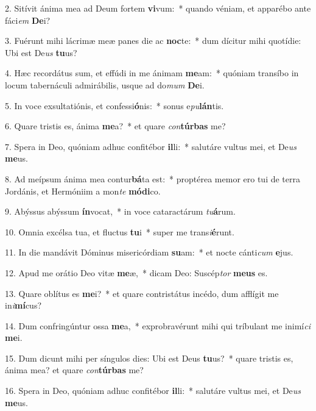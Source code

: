 2. Sitívit ánima mea ad Deum fortem \textbf{vi}vum:~*  quando véniam, et apparébo ante fáci\textit{em} \textbf{De}i?\

3. Fuérunt mihi lácrimæ meæ panes die ac \textbf{noc}te:~*  dum dícitur mihi quotídie: Ubi est De\textit{us} \textbf{tu}us?\

4. Hæc recordátus sum, et effúdi in me ánimam \textbf{me}am:~*  quóniam transíbo in locum tabernáculi admirábilis, usque ad do\textit{mum} \textbf{De}i.\

5. In voce exsultatiónis, et confessi\textbf{ó}nis:~*  sonus e\textit{pu}\textbf{lán}tis.\

6. Quare tristis es, ánima \textbf{me}a?~*  et quare \textit{con}\textbf{túr}\textbf{bas} me?\

7. Spera in Deo, quóniam adhuc confitébor \textbf{il}li:~*  salutáre vultus mei, et De\textit{us} \textbf{me}us.\

8. Ad meípsum ánima mea contur\textbf{bá}ta est:~*  proptérea memor ero tui de terra Jordánis, et Hermóniim a mon\textit{te} \textbf{mó}\textbf{di}co.\

9. Abýssus abýssum \textbf{ín}vocat,~*  in voce cataractárum \textit{tu}\textbf{á}rum.\

10. Omnia excélsa tua, et fluctus \textbf{tu}i~*  super me trans\textit{i}\textbf{é}runt.\

11. In die mandávit Dóminus misericórdiam \textbf{su}am:~*  et nocte cánti\textit{cum} \textbf{e}jus.\

12. Apud me orátio Deo vitæ \textbf{me}æ,~*  dicam Deo: Suscép\textit{tor} \textbf{me}\textbf{us} es.\

13. Quare oblítus es \textbf{me}i?~*  et quare contristátus incédo, dum afflígit me in\textit{i}\textbf{mí}cus?\

14. Dum confringúntur ossa \textbf{me}a,~*  exprobravérunt mihi qui tríbulant me inimí\textit{ci} \textbf{me}i.\

15. Dum dicunt mihi per síngulos dies: Ubi est Deus \textbf{tu}us?~*  quare tristis es, ánima mea? et quare \textit{con}\textbf{túr}\textbf{bas} me?\

16. Spera in Deo, quóniam adhuc confitébor \textbf{il}li:~*  salutáre vultus mei, et De\textit{us} \textbf{me}us.\

